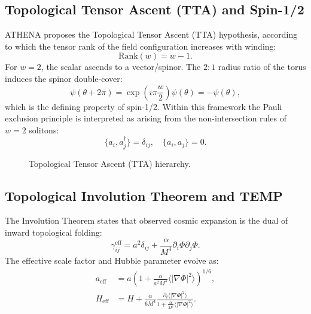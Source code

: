 \documentclass[12pt,a4paper]{article}
\numberwithin{equation}{section}
\begin{document}
\subsection{Topological Tensor Ascent (TTA) and Spin-1/2}

ATHENA proposes the Topological Tensor Ascent (TTA) hypothesis, according to which the tensor rank of the field configuration increases with winding:
\begin{equation}
\text{Rank}(w) = w - 1.
\end{equation}
For $w=2$, the scalar ascends to a vector/spinor. The $2:1$ radius ratio of the torus induces the spinor double-cover:
\begin{equation}
\psi(\theta + 2\pi) = \exp\left(i \pi \frac{w}{2}\right) \psi(\theta) = -\psi(\theta),
\end{equation}
which is the defining property of spin-1/2. Within this framework the Pauli exclusion principle is interpreted as arising from the non-intersection rules of $w=2$ solitons:
\begin{equation}
\{a_i, a_j^\dagger\} = \delta_{ij}, \quad \{a_i, a_j\} = 0.
\end{equation}

\begin{figure}[h]
\centering
{}
\caption{Topological Tensor Ascent (TTA) hierarchy.}
\label{fig:tta}
\end{figure}

\subsection{Topological Involution Theorem and TEMP}

The Involution Theorem states that observed cosmic expansion is the dual of inward topological folding:
\begin{equation}
\gamma_{ij}^{\text{eff}} = a^2 \delta_{ij} + \frac{\alpha}{M^4} \partial_i \Phi \partial_j \Phi.
\end{equation}
The effective scale factor and Hubble parameter evolve as:
\begin{align}
a_{\text{eff}} &= a \left(1 + \frac{\alpha}{a^2 M^4} \langle |\nabla \Phi|^2 \rangle \right)^{1/6}, \\
H_{\text{eff}} &= H + \frac{\alpha}{6M^4} \frac{\partial_t \langle |\nabla \Phi|^2 \rangle}{1 + \frac{\alpha}{M^4} \langle |\nabla \Phi|^2 \rangle}.
\end{align}
\end{document}
